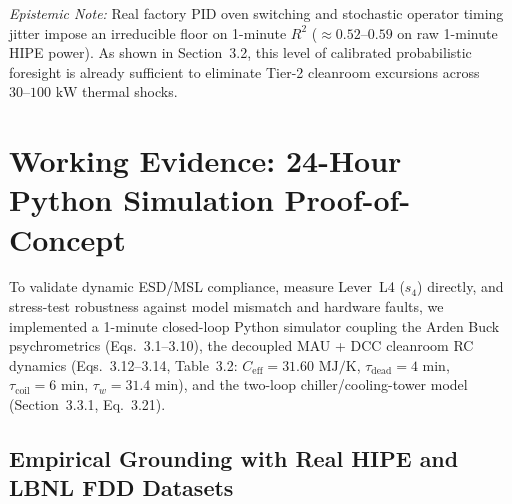 \emph{Epistemic Note:} Real factory PID oven switching and stochastic operator timing jitter impose an irreducible floor on 1-minute $R^2$ ($\approx 0.52\text{--}0.59$ on raw 1-minute HIPE power). As shown in Section~3.2, this level of calibrated probabilistic foresight is already sufficient to eliminate Tier-2 cleanroom excursions across $30\text{--}100\text{ kW}$ thermal shocks.


\section{Working Evidence: 24-Hour Python Simulation Proof-of-Concept}
\label{sec:poc}

To validate dynamic ESD/MSL compliance, measure Lever~L4 ($s_4$) directly, and stress-test robustness against model mismatch and hardware faults, we implemented a 1-minute closed-loop Python simulator coupling the Arden Buck psychrometrics (Eqs.~3.1--3.10), the decoupled MAU + DCC cleanroom RC dynamics (Eqs.~3.12--3.14, Table~3.2: $C_{\text{eff}} = 31.60\text{ MJ/K}$, $\tau_{\text{dead}} = 4\text{ min}$, $\tau_{\text{coil}} = 6\text{ min}$, $\tau_w = 31.4\text{ min}$), and the two-loop chiller/cooling-tower model (Section~3.3.1, Eq.~3.21).

\subsection{Empirical Grounding with Real HIPE and LBNL FDD Datasets}

